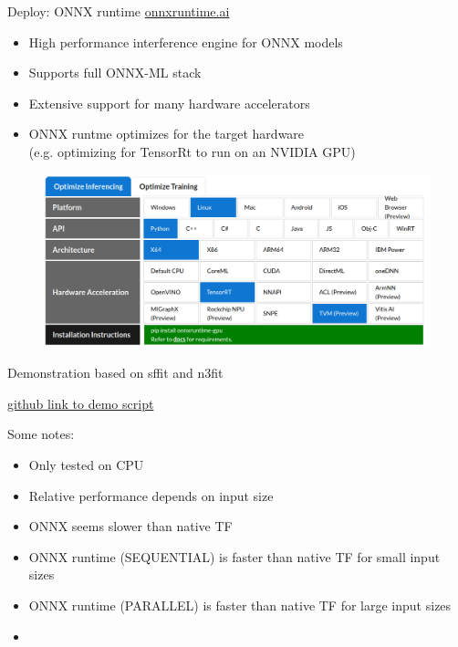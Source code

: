 \documentclass[aspectratio=169,9pt]{beamer}
\begin{document}
\begin{frame}[t]{Deploy: ONNX runtime}{\color{blue} \href{https://onnxruntime.ai/}{onnxruntime.ai}}
  \begin{itemize}
    \item High performance interference engine for ONNX models
    \item Supports full ONNX-ML stack
    \item Extensive support for many hardware accelerators
    \item ONNX runtme optimizes for the target hardware \\
          (e.g. optimizing for TensorRt to run on an NVIDIA GPU)
  \end{itemize}
  \begin{figure}
    \centering
    \includegraphics[width=.6\textwidth]{ONNX-runtime-get-started-chart.png}
  \end{figure}
\end{frame}


\begin{frame}[t,fragile]{Demonstration based on sffit and n3fit}
  \begin{center}
    \href{https://github.com/RoyStegeman/slides/tree/main/ONNX/demos}{\color{blue}github link to demo script}
  \end{center}
  Some notes:
  \begin{itemize}
    \item Only tested on CPU
    \item Relative performance depends on input size
    \item ONNX seems slower than native TF
    \item ONNX runtime (SEQUENTIAL) is faster than native TF for small input sizes
    \item ONNX runtime (PARALLEL) is faster than native TF for large input sizes
    \item 
  \end{itemize}
\end{frame}


\end{document}

